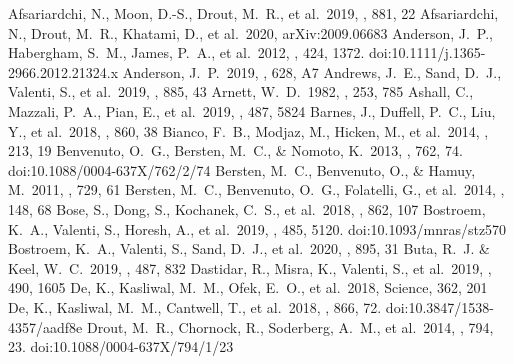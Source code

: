 \documentclass[twocolumn, linenumbers]{aastex62}
\begin{document}
 
\begin{thebibliography}{99}
 Afsariardchi, N., Moon, D.-S., Drout, M.~R., et al.\ 2019, \apj, 881, 22
 Afsariardchi, N., Drout, M.~R., Khatami, D., et al.\ 2020, arXiv:2009.06683
 Anderson, J.~P., Habergham, S.~M., James, P.~A., et al.\ 2012, \mnras, 424, 1372. doi:10.1111/j.1365-2966.2012.21324.x
 Anderson, J.~P.\ 2019, \aap, 628, A7
 Andrews, J.~E., Sand, D.~J., Valenti, S., et al.\ 2019, \apj, 885, 43
 Arnett, W.~D.\ 1982, \apj, 253, 785
 Ashall, C., Mazzali, P.~A., Pian, E., et al.\ 2019, \mnras, 487, 5824
 Barnes, J., Duffell, P.~C., Liu, Y., et al.\ 2018, \apj, 860, 38
 Bianco, F.~B., Modjaz, M., Hicken, M., et al.\ 2014, \apjs, 213, 19
 Benvenuto, O.~G., Bersten, M.~C., \& Nomoto, K.\ 2013, \apj, 762, 74. doi:10.1088/0004-637X/762/2/74
 Bersten, M.~C., Benvenuto, O., \& Hamuy, M.\ 2011, \apj, 729, 61 
 Bersten, M.~C., Benvenuto, O.~G., Folatelli, G., et al.\ 2014, \aj, 148, 68
 Bose, S., Dong, S., Kochanek, C.~S., et al.\ 2018, \apj, 862, 107
 Bostroem, K.~A., Valenti, S., Horesh, A., et al.\ 2019, \mnras, 485, 5120. doi:10.1093/mnras/stz570
 Bostroem, K.~A., Valenti, S., Sand, D.~J., et al.\ 2020, \apj, 895, 31
 Buta, R.~J. \& Keel, W.~C.\ 2019, \mnras, 487, 832
 Dastidar, R., Misra, K., Valenti, S., et al.\ 2019, \mnras, 490, 1605
 De, K., Kasliwal, M.~M., Ofek, E.~O., et al.\ 2018, Science, 362, 201
 De, K., Kasliwal, M.~M., Cantwell, T., et al.\ 2018, \apj, 866, 72. doi:10.3847/1538-4357/aadf8e
 Drout, M.~R., Chornock, R., Soderberg, A.~M., et al.\ 2014, \apj, 794, 23. doi:10.1088/0004-637X/794/1/23

\end{thebibliography}
\end{document}
